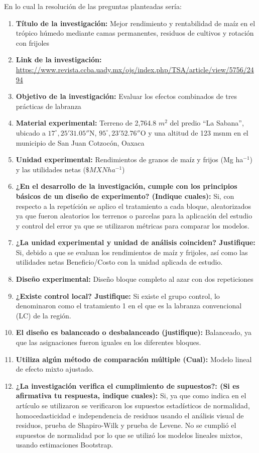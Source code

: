 En lo cual la resolución de las preguntas planteadas sería:

\begin{enumerate}
	\item \textbf{Título de la investigación:} Mejor rendimiento y rentabilidad de maíz en el trópico húmedo mediante camas permanentes, residuos de cultivos y rotación con frijoles
	\item \textbf{Link de la investigación:} \url{https://www.revista.ccba.uady.mx/ojs/index.php/TSA/article/view/5756/2494}
	\item \textbf{Objetivo de la investigación:} Evaluar los efectos combinados de tres prácticas de labranza
	\item \textbf{Material experimental:} Terreno de 2,764.8 $m^2$ del predio ``La Sabana'', ubicado a $17^{\circ},25'31.05''$N, $95^{\circ},23'52.76''$O y una altitud de 123 msnm en el municipio de San Juan Cotzocón, Oaxaca
	\item \textbf{Unidad experimental:} Rendimientos de granos de maíz y frijos (Mg ha$^{-1}$) y las utilidades netas ($\$MXN ha^{-1}$)
	\item \textbf{¿En el desarrollo de la investigación, cumple con los principios básicos de un diseño de experimento? (Indique cuales):} Si, con respecto a la repetíción se aplico el tratamiento a cada bloque, aleatorizados ya que fueron aleatorios los terrenos o parcelas para la aplicación del estudio y control del error ya que se utilizaron métricas para comparar los modelos.
	\item \textbf{¿La unidad experimental y unidad de análisis coinciden? Justifique:} Si, debido a que se evaluan los rendimientos de maíz y frijoles, así como las utilidades netas Beneficio/Costo con la unidad aplicada de estudio.
	\item \textbf{Diseño experimental:} Diseño bloque completo al azar con dos repeticiones
	\item \textbf{¿Existe control local? Justifique:} Si existe el grupo control, lo denominaron como el tratamiento 1 en el que es la labranza convencional (LC) de la región.
	\item \textbf{El diseño es balanceado o desbalanceado (justifique):} Balanceado, ya que las asignaciones fueron iguales en los diferentes bloques.
	\item \textbf{Utiliza algún método de comparación múltiple (Cual):} Modelo lineal de efecto mixto ajustado.
	\item \textbf{¿La investigación verifica el cumplimiento de supuestos?: (Si es afirmativa tu respuesta, indique cuales):} Si, ya que como indica en el artículo se utilizaron se verificaron los supuestos estadísticos de normalidad, homocedasticidad e independencia de residuos usando el análisis visual de residuos, prueba de Shapiro-Wilk y prueba de Levene. No se cumplió el supuestos de normalidad por lo que se utilizó los modelos lineales mixtos, usando estimaciones Bootstrap.
\end{enumerate}

